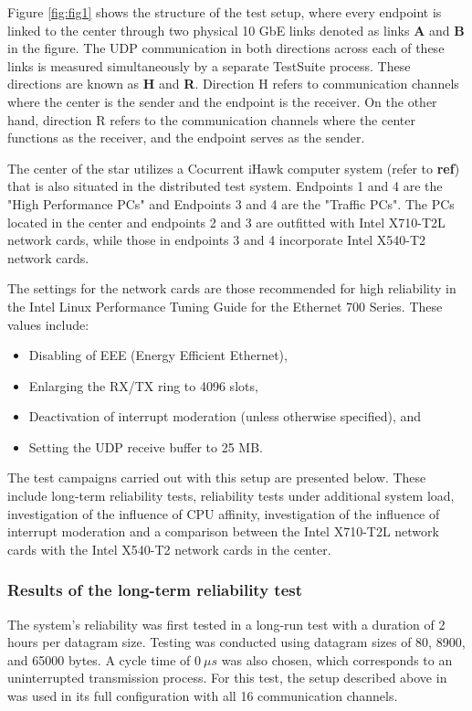 \documentclass[	a4paper,
				11pt,
				DIV=11,
				bigheadings,
				idxtotoc,
				listof=totoc,	
				bibtotoc,		
				halfparskip,
				cleardoubleempty,
				oneside,
				openright]{scrartcl}
\begin{document}
Figure \ref{fig:fig1} shows the structure of the test setup, where every endpoint is linked to the center through two physical 10 GbE links denoted as links \textbf{A} and \textbf{B} in the figure. The UDP communication in both directions across each of these links is measured simultaneously by a separate TestSuite process. These directions are known as \textbf{H} and \textbf{R}. Direction H refers to communication channels where the center is the sender and the endpoint is the receiver. On the other hand, direction R refers to the communication channels where the center functions as the receiver, and the endpoint serves as the sender.

The center of the star utilizes a Cocurrent iHawk computer system (refer to \textbf{ref}) that is also situated in the distributed test system. Endpoints 1 and 4 are the "High Performance PCs" and Endpoints 3 and 4 are the "Traffic PCs". The PCs located in the center and endpoints 2 and 3 are outfitted with Intel X710-T2L network cards, while those in endpoints 3 and 4 incorporate Intel X540-T2 network cards.

The settings for the network cards are those recommended for high reliability in the Intel Linux Performance Tuning Guide for the Ethernet 700 Series. These values include:

\begin{itemize}

\item Disabling of EEE (Energy Efficient Ethernet),
\item Enlarging the RX/TX ring to 4096 slots,
\item Deactivation of interrupt moderation (unless otherwise specified), and
\item Setting the UDP receive buffer to 25 MB.
\end{itemize}


The test campaigns carried out with this setup are presented below. These include long-term reliability tests, reliability tests under additional system load, investigation of the influence of CPU affinity, investigation of the influence of interrupt moderation and a comparison between the Intel X710-T2L network cards with the Intel X540-T2 network cards in the center.


\subsubsection{Results of the long-term reliability test}
The system's reliability was first tested in a long-run test with a duration of 2 hours per datagram size. Testing was conducted using datagram sizes of 80, 8900, and 65000 bytes. A cycle time of \( 0\ \mu s \) was also chosen, which corresponds to an uninterrupted transmission process. For this test, the setup described above in was used in its full configuration with all 16 communication channels.
\end{document}
